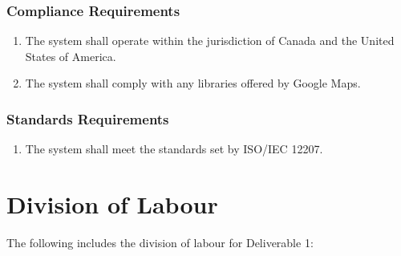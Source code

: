\documentclass[titlepage]{article}
\newcounter{req}
\begin{document}
		\subsubsection{Compliance Requirements}
		\label{ssub:compliance_requirements}
		\begin{enumerate}[{LR}1. ]
		\setcounter{enumi}{\value{req}}
			\item
			The system shall operate within the jurisdiction of Canada and the United States of America.
			\item
			The system shall comply with any libraries offered by Google Maps.
		\setcounter{req}{\theenumi}
		\end{enumerate}
		
		\subsubsection{Standards Requirements}
		\label{ssub:standards_requirements}
		\begin{enumerate}[{LR}1. ]
		\setcounter{enumi}{\value{req}}
			\item
			The system shall meet the standards set by ISO/IEC 12207.
		\setcounter{req}{\theenumi}
		\end{enumerate}
		
		
		
		\clearpage{}
		\appendix
		\section{Division of Labour}
		\label{sec:division_of_labour}
		The following includes the division of labour for Deliverable 1:
		
\end{document}
